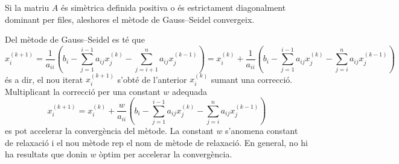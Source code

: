 \begin{theorem}
	Si la matriu $A$ és simètrica definida positiva o és estrictament diagonalment dominant per files, aleshores el mètode de Gauss--Seidel convergeix.
\end{theorem}

Del mètode de Gauss--Seidel es té que
\[
	x_i^{(k+1)} = 
	\frac{1}{a_{ii}}
	\left(
	b_i - \sum_{j=1}^{i-1} a_{ij} x_j^{(k)} - \sum_{j=i+1}^n a_{ij} x_j^{(k-1)}
	\right) = 
	x_i^{(k)} + 
	\frac{1}{a_{ii}}
	\left(
	b_i - \sum_{j=1}^{i-1} a_{ij} x_j^{(k)} - \sum_{j=i}^n a_{ij} x_j^{(k-1)}
	\right)	
\]
és a dir, el nou iterat $x_i^{(k+1)}$ s'obté de l'anterior $x_i^{(k)}$ sumant una correcció. Multiplicant la correcció per una constant $w$ adequada
\[
	x_i^{(k+1)} = 
	x_i^{(k)} + 
	\frac{w}{a_{ii}}
	\left(
	b_i - \sum_{j=1}^{i-1} a_{ij} x_j^{(k)} - \sum_{j=i}^n a_{ij} x_j^{(k-1)}
	\right)	
\]
es pot accelerar la convergència del mètode. La constant $w$ s'anomena constant de relaxació i el nou mètode rep el nom de mètode de relaxació. En general, no hi ha resultats que donin $w$ òptim per accelerar la convergència.


 